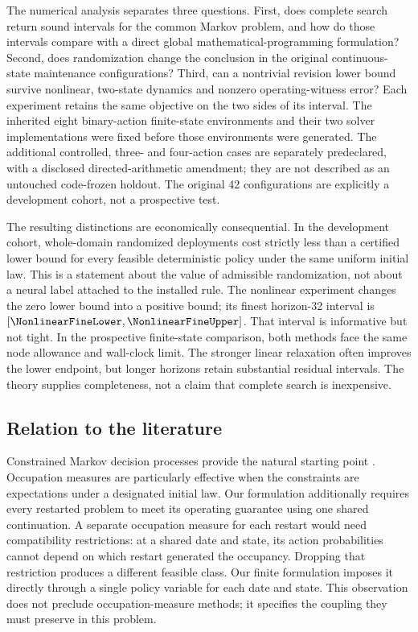 The numerical analysis separates three questions. First, does complete search return sound intervals for the common Markov problem, and how do those intervals compare with a direct global mathematical-programming formulation? Second, does randomization change the conclusion in the original continuous-state maintenance configurations? Third, can a nontrivial revision lower bound survive nonlinear, two-state dynamics and nonzero operating-witness error? Each experiment retains the same objective on the two sides of its interval. The inherited eight binary-action finite-state environments and their two solver implementations were fixed before those environments were generated. The additional controlled, three- and four-action cases are separately predeclared, with a disclosed directed-arithmetic amendment; they are not described as an untouched code-frozen holdout. The original 42 configurations are explicitly a development cohort, not a prospective test.

The resulting distinctions are economically consequential. In the development cohort, \PrimaryStrict{} whole-domain randomized deployments cost strictly less than a certified lower bound for every feasible deterministic policy under the same uniform initial law. This is a statement about the value of admissible randomization, not about a neural label attached to the installed rule. The nonlinear experiment changes the zero lower bound into a positive bound; its finest horizon-32 interval is $[\NonlinearFineLower,\NonlinearFineUpper]$. That interval is informative but not tight. In the prospective finite-state comparison, both methods face the same node allowance and wall-clock limit. The stronger linear relaxation often improves the lower endpoint, but longer horizons retain substantial residual intervals. The theory supplies completeness, not a claim that complete search is inexpensive.

\subsection{Relation to the literature}\label{sec:literature}
Constrained Markov decision processes provide the natural starting point \citep{Altman1999}. Occupation measures are particularly effective when the constraints are expectations under a designated initial law. Our formulation additionally requires every restarted problem to meet its operating guarantee using one shared continuation. A separate occupation measure for each restart would need compatibility restrictions: at a shared date and state, its action probabilities cannot depend on which restart generated the occupancy. Dropping that restriction produces a different feasible class. Our finite formulation imposes it directly through a single policy variable for each date and state. This observation does not preclude occupation-measure methods; it specifies the coupling they must preserve in this problem.

